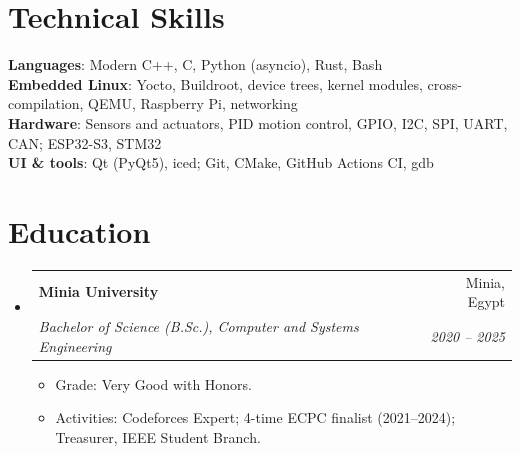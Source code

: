 \documentclass[letterpaper,11pt]{article}
\makeatletter
\newcommand{\resumeItem}[1]{
  \item\small{
    {#1 \vspace{-2pt}}
  }
}
\newcommand{\resumeSubheading}[4]{
  \vspace{-2pt}\item
    \begin{tabular*}{0.97\textwidth}[t]{l@{\extracolsep{\fill}}r}
      \textbf{#1} & #2 \\
      \textit{\small#3} & \textit{\small #4} \\
    \end{tabular*}\vspace{-7pt}
}
\newcommand{\resumeSubHeadingListStart}{\begin{itemize}[leftmargin=0.15in, label={}]}
\newcommand{\resumeSubHeadingListEnd}{\end{itemize}}
\newcommand{\resumeItemListStart}{\begin{itemize}}
\newcommand{\resumeItemListEnd}{\end{itemize}\vspace{-5pt}}
\makeatother
\begin{document}
%
\section{Technical Skills}
 \begin{itemize}[leftmargin=0.15in, label={}]
    \small{\item{
     \textbf{Languages}{: Modern C++, C, Python (asyncio), Rust, Bash} \\
     \textbf{Embedded Linux}{: Yocto, Buildroot, device trees, kernel modules, cross-compilation, QEMU, Raspberry Pi, networking} \\
     \textbf{Hardware}{: Sensors and actuators, PID motion control, GPIO, I2C, SPI, UART, CAN; ESP32-S3, STM32} \\
     \textbf{UI \& tools}{: Qt (PyQt5), iced; Git, CMake, GitHub Actions CI, gdb}
    }}
 \end{itemize}

\section{Education}
  \resumeSubHeadingListStart
    \resumeSubheading
      {Minia University}{Minia, Egypt}
      {Bachelor of Science (B.Sc.), Computer and Systems Engineering}{2020 -- 2025}
      \resumeItemListStart
        \resumeItem{Grade: Very Good with Honors.}
        \resumeItem{Activities: Codeforces Expert; 4-time ECPC finalist (2021--2024); Treasurer, IEEE Student Branch.}
      \resumeItemListEnd
  \resumeSubHeadingListEnd


\end{document}
